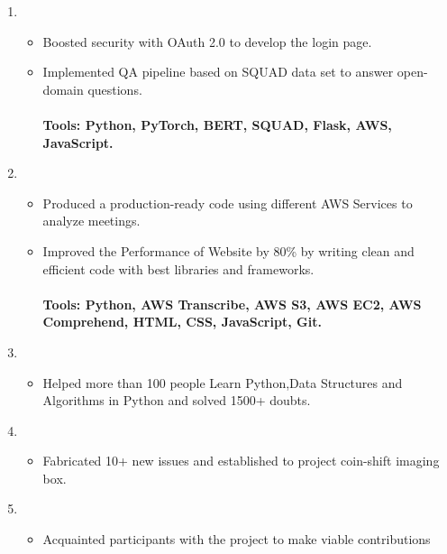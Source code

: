\documentclass[10pt,a4paper]{altacv}
\begin{document}
\begin{enumerate}
\item {}
\begin{itemize}
\item Boosted security with OAuth 2.0 to develop the login page.
\item Implemented QA pipeline based on SQUAD data set to answer open-domain questions.
\\~\\\textbf{Tools: Python, PyTorch, BERT, SQUAD, Flask, AWS, JavaScript.}
\end{itemize}
\divider
\item {}
\begin{itemize}
\item Produced a production-ready code using different AWS Services to analyze meetings.
\item Improved the Performance of Website by 80\% by writing clean and efficient code with best libraries and frameworks. 
\\~\\\textbf{Tools: Python, AWS Transcribe, AWS S3, AWS EC2, AWS Comprehend, HTML, CSS, JavaScript, Git.}
\end{itemize}
\divider
\item {}
\begin{itemize}
\item Helped more than 100 people Learn Python,Data Structures and Algorithms in Python and solved 1500+ doubts.
\end{itemize}
\divider
\item {}
\begin{itemize}
\item Fabricated 10+ new issues and established to project coin-shift imaging box.
\end{itemize}
\divider
\item {}
\begin{itemize}
\item Acquainted participants with the project to make viable contributions
\end{itemize}
\end{enumerate}





\medskip
\end{document}
